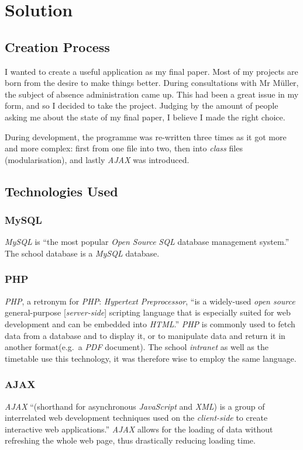 \documentclass[12pt,a4paper,twoside,openany]{report}
\begin{document}
\chapter{Solution}

\section{Creation Process}
I wanted to create a useful application as my final paper. Most of my projects
are born from the desire to make things better. During consultations with Mr
M\"{u}ller, the subject of absence administration came up. This had been a
great issue in my form, and so I decided to take the project. Judging by the
amount of people asking me about the state of my final paper, I believe I made
the right choice.

During development, the programme was re-written three times as it got more
and more complex: first from one file into two, then into \textit{class} files
(modularisation), and lastly \textit{AJAX} was introduced.

\section{Technologies Used}

\subsection{MySQL}
\label{mysql}
\textit{MySQL} is ``the most popular \textit{Open Source} \textit{SQL} database
management system.''\cite{mysql} The school database is a \textit{MySQL} database.

\subsection{PHP}
\label{php}
\textit{PHP}, a retronym for \textit{PHP}: \textit{Hypertext}
\textit{Preprocessor}, ``is a widely-used \textit{open source} general-purpose
[\textit{server-side}] scripting language that is especially suited for web
development and can be embedded into \textit{HTML}.''\cite{php_what}
\textit{PHP} is commonly used to fetch data from a database and to display it,
or to manipulate data and return it in another format(e.g.\ a \textit{PDF}
document). The school \textit{intranet} as well as the timetable use this
technology, it was therefore wise to employ the same language.

\subsection{AJAX}
\label{ajax}
\textit{AJAX} ``(shorthand for asynchronous \textit{JavaScript} and
\textit{XML}) is a group of interrelated web development techniques used on the
\textit{client-side} to create interactive web applications.''\cite{ajax}
\textit{AJAX} allows for the loading of data without refreshing the whole web
page, thus drastically reducing loading time.
\end{document}
